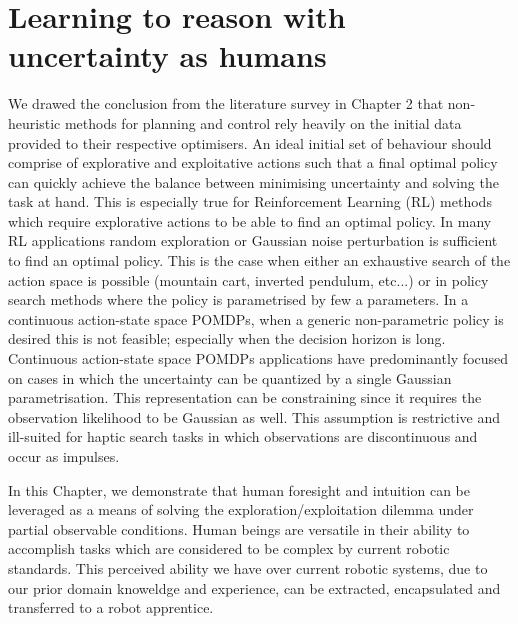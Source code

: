 \chapter{Learning to reason with uncertainty as humans}
%
%
%

We drawed the conclusion from the literature survey in Chapter 2 that non-heuristic methods for planning and control 
rely heavily on the initial data provided to their respective optimisers. An ideal initial set of behaviour should comprise 
of explorative and exploitative actions such that a final optimal policy can quickly achieve the balance between minimising 
uncertainty and solving the task at hand. This is especially true for Reinforcement Learning (RL) methods which require 
explorative actions to be able to find an optimal policy. In many RL applications random exploration or Gaussian noise perturbation
is sufficient to find an optimal policy. This is the case when either an exhaustive search of the action space is possible 
(mountain cart, inverted pendulum, etc...) or in policy search methods where the policy is parametrised by few a parameters.
In a continuous action-state space POMDPs, when a generic non-parametric policy is desired  this is not feasible; especially 
when the decision horizon is long. Continuous action-state space POMDPs applications have predominantly focused on cases in which 
the uncertainty can be quantized by a single Gaussian parametrisation. This representation can be constraining since it requires 
the observation likelihood to be Gaussian as well. This assumption is restrictive and ill-suited for haptic search tasks in 
which observations are discontinuous and occur as impulses. 

In this Chapter, we demonstrate that human foresight and intuition can be leveraged as a means of solving the 
exploration/exploitation dilemma under partial observable conditions. Human beings are versatile in their ability to 
accomplish tasks which are considered to be complex by current robotic standards. This perceived ability we have over 
current robotic systems, due to our prior domain knoweldge and experience, can be extracted, encapsulated and transferred 
to a robot apprentice.

